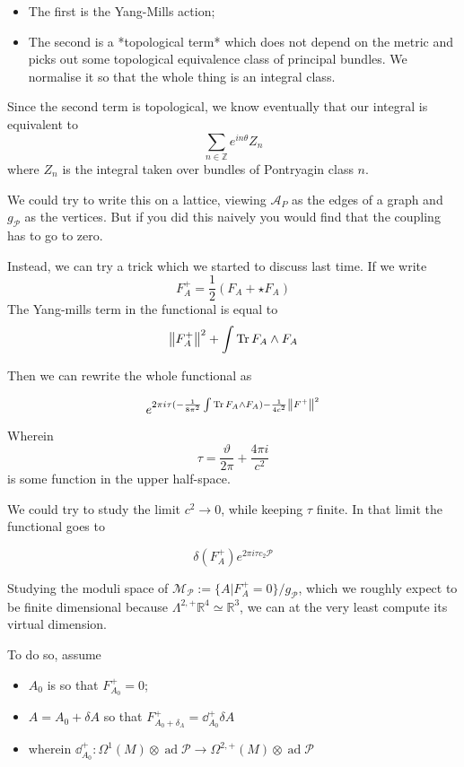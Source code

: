 \documentclass[leqno, openany]{memoir}
\theoremstyle{definition}
\theoremstyle{remark}
\theoremstyle{plain}
\theoremstyle{definition}
\theoremstyle{remark}
\DeclareMathOperator{\ad}{ad}
\begin{document}
\begin{itemize}
  \item The first is the Yang-Mills action;
\item The second is a *topological term* which does not depend on the metric and picks out some topological equivalence class of principal bundles. We normalise it so that the whole thing is an integral class.
\end{itemize}

Since the second term is topological, we know eventually that our integral is equivalent to
\[
\sum_{n \in \mathbb{Z}} e^{i n \theta} Z_{n}
\]
where $Z_{n}$ is the integral taken over bundles of Pontryagin class $n$.

  We could try to write this on a lattice, viewing $\mathcal{A}_{P}$ as the edges of a graph and $g_{\mathcal{P}}$ as the vertices. But if you did this naively you would find that the coupling has to go to zero.

  Instead, we can try a trick which we started to discuss last time. If we write
\[
F_{A}^{+} = \frac{1}{2} (F_{A} + \star F_{A})
\]
The Yang-mills term in the functional is equal to
\[
\norm{F_{A}^{+}}^{2} + \int \Tr F_{A} \wedge F_{A}
\]

Then we can rewrite the whole functional as

\[
e^{2\pi i \tau( -\frac{1}{8\pi^{2}} \int \Tr F_{A} \wedge F_{A} ) - \frac{1}{4c^{2}} \norm{F^{+}}^{2}}
\]

Wherein
\[
\tau = \frac{\vartheta}{2\pi} + \frac{4\pi i }{c^{2}}
\]
is some function in the upper half-space.

We could try to study the limit $c^{2} \to 0$, while keeping $\tau$ finite.  In that limit the functional goes to

\[
\delta(F_{A}^{+}) e^{2\pi i \tau c_{2}\mathcal{P}}
\]

Studying the moduli space of $\mathcal{M}_{\mathcal{P}} := \{ A | F_{A}^{+} = 0\}/g_{\mathcal{P}}$,  which we roughly expect to be finite dimensional because $\Lambda^{2,+} \mathbb{R}^{4} \simeq \mathbb{R}^{3}$, we can at the very least compute its virtual dimension.

To do so, assume
\begin{itemize}
  \item $A_{0}$ is so that $F_{A_{0}}^{+} = 0$;
  \item $A = A_{0} + \delta A$ so that $F_{A_{0} + \delta_{A}}^{+} = \dd_{A_{0}}^{+} \delta A$
        \item wherein $\dd^{+}_{A_{0}} : \Omega^{1}(M) \otimes \ad\mathcal{P} \to \Omega^{2,+} (M) \otimes \ad \mathcal{P}$
\end{itemize}
\end{document}
